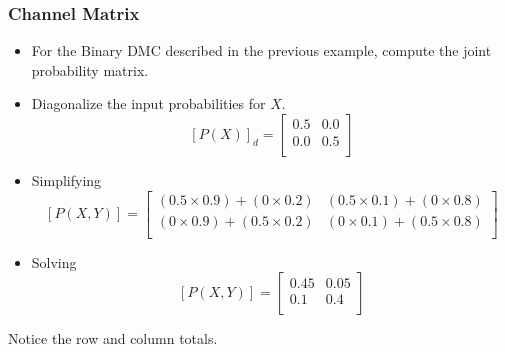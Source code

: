 \documentclass[a4]{beamer}
\begin{document}
\begin{frame}
\frametitle{Channel Matrix}
\begin{itemize}
\item For the Binary DMC described in the previous example, compute the joint probability matrix.
\item Diagonalize the input probabilities for $X$.
\[  [P(X)]_d  = \left[ \begin{array}{cc}
0.5 & 0.0  \\
0.0 & 0.5\\
\end{array} \right] \]

\item Simplifying
\[  [P(X,Y)]  =  \left[ \begin{array}{cc}
(0.5 \times 0.9)+(0 \times 0.2) & (0.5 \times 0.1)+(0 \times 0.8) \\
(0 \times 0.9)+(0.5 \times 0.2) & (0 \times 0.1)+(0.5 \times 0.8) \\
\end{array} \right]  \]


\item Solving
\[  [P(X,Y)]  =  \left[ \begin{array}{cc}
0.45 & 0.05 \\
0.1  & 0.4 \\
\end{array} \right]  \]
\end{itemize}
Notice the row and column totals.
\end{frame}
\end{document}
